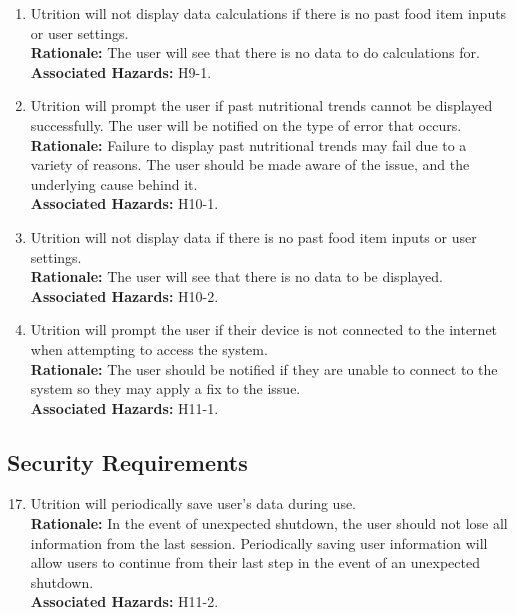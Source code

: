 \documentclass{article}
\begin{document}
\begin{enumerate}[{SR}1.]
	\item Utrition will not display data calculations if there is no past food item inputs or user settings.\\
	\textbf{Rationale:}  The user will see that there is no data to do calculations for.\\
	\textbf{Associated Hazards:} H9-1.
	
	\item Utrition will prompt the user if past nutritional trends cannot
	be displayed successfully. The user will be notified on the type of error 
	that occurs. \\
	\textbf{Rationale:}  Failure to display past nutritional trends may fail 
	due to a variety of reasons. The user should be made aware of the issue, 
	and the underlying cause behind it.\\	
	\textbf{Associated Hazards:} H10-1.
	
	\item Utrition will not display data if there is no past food item inputs or user settings.\\
	\textbf{Rationale:}  The user will see that there is no data to be displayed.\\
	\textbf{Associated Hazards:} H10-2.
	
	\item Utrition will prompt the user if their device is not connected to the 
	internet when attempting to access the system. \\
	\textbf{Rationale:}  The user should be notified if they are unable to 
	connect to the system so they may apply a fix to the issue. \\	
	\textbf{Associated Hazards:} H11-1.
\end{enumerate}

\subsection{Security Requirements}
\begin{enumerate}[{SR}1.] 
	\setcounter{enumi}{16}
	
	\item Utrition will periodically save user’s data during use. \\
	\textbf{Rationale:} In the event of unexpected shutdown, the user should 
	not lose all information from the last session. Periodically saving user 
	information will allow users to continue from their last step in the event 
	of an unexpected shutdown. \\	
	\textbf{Associated Hazards:} H11-2.
\end{enumerate}
\end{document}
